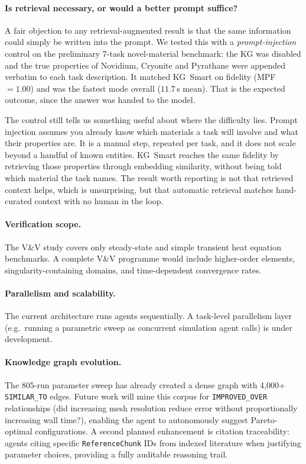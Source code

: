 \documentclass[preprint,review,12pt]{elsarticle}
\newif\ifrevisionsvisible
\newcommand{\revised}[1]{%
  \ifrevisionsvisible\textcolor{revisionred}{#1}\else#1\fi}
\begin{document}
\revised{\paragraph{Is retrieval necessary, or would a better prompt suffice?}
A fair objection to any retrieval-augmented result is that the same
information could simply be written into the prompt.  We tested this with
a \emph{prompt-injection} control on the preliminary 7-task
novel-material benchmark: the KG was disabled and the true properties of
Novidium, Cryonite and Pyrathane were appended verbatim to each task
description.  It matched KG~Smart on fidelity (MPF~$=1.00$) and was the
fastest mode overall ($11.7$\,s mean).  That is the expected outcome,
since the answer was handed to the model.}

\revised{The control still tells us something useful about where the
difficulty lies.  Prompt injection assumes you already know which
materials a task will involve and what their properties are.  It is a
manual step, repeated per task, and it does not scale beyond a handful of
known entities.  KG~Smart reaches the same fidelity by retrieving those
properties through embedding similarity, without being told which
material the task names.  The result worth reporting is not that
retrieved context helps, which is unsurprising, but that automatic
retrieval matches hand-curated context with no human in the loop.}

\paragraph{Verification scope.}
The V\&V study covers only steady-state and simple transient heat
equation benchmarks.  A complete V\&V programme would include
higher-order elements, singularity-containing domains, and
time-dependent convergence rates.

\paragraph{Parallelism and scalability.}
The current architecture runs agents sequentially.  A task-level
parallelism layer (e.g.\ running a parametric sweep as concurrent
simulation agent calls) is under development.

\paragraph{Knowledge graph evolution.}
The 805-run parameter sweep has already created a dense graph with
4{,}000+ \texttt{SIMILAR\_TO} edges.  Future work will mine this corpus
for \texttt{IMPROVED\_OVER} relationships (did increasing mesh resolution
reduce error without proportionally increasing wall time?), enabling the
agent to autonomously suggest Pareto-optimal configurations.  A second
planned enhancement is citation traceability: agents citing specific
\texttt{ReferenceChunk} IDs from indexed literature when justifying
parameter choices, providing a fully auditable reasoning trail.
\end{document}
